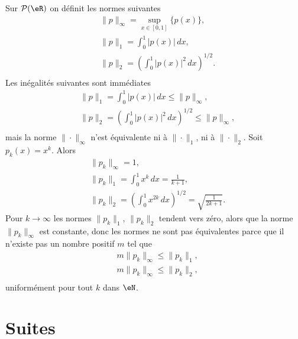 Sur $\mathcal{P}(\eR)$ on définit les normes suivantes 
\begin{equation}
\begin{aligned}
&\|p\|_\infty=\sup_{x\in[0,1]}\{p(x)\},\\
&\|p\|_1 =\int_0^1|p(x)|\, dx,\\
&\|p\|_2 =\left(\int_0^1|p(x)|^2\, dx\right)^{1/2}.\\
\end{aligned}
\end{equation}
Les inégalités suivantes sont  immédiates
\begin{equation}
\begin{aligned}
&\|p\|_1 =\int_0^1|p(x)|\, dx\leq \|p\|_\infty,\\
&\|p\|_2 =\left(\int_0^1|p(x)|^2\, dx\right)^{1/2}\leq \|p\|_\infty,\\
\end{aligned}
\end{equation}
mais la norme $\|\cdot\|_\infty$ n'est  équivalente ni à $\|\cdot\|_1$, ni à $\|\cdot\|_2$. Soit $p_k(x)= x^k$. Alors
\begin{equation}
\begin{aligned}
&\|p_k\|_\infty=1,\\
&\|p_k\|_1 =\int_0^1x^k\, dx=  \frac{1}{k+1},\\
&\|p_k\|_2 =\left(\int_0^1x^{2k}\, dx\right)^{1/2}=\sqrt{\frac{1}{2k+1}}.
\end{aligned}
\end{equation}
Pour $k\to \infty$ les normes $\|p_k\|_1$, $\|p_k\|_2$ tendent vers zéro, alors que la norme $\|p_k\|_\infty$ est constante, donc les normes ne sont pas équivalentes parce que il n'existe pas un nombre positif $m$ tel que 
\begin{equation}
\begin{aligned}
& m \|p_k\|_\infty\leq \|p_k\|_1 ,\\
& m \|p_k\|_\infty\leq \|p_k\|_2 ,\\
\end{aligned}
\end{equation}
uniformément pour tout $k$ dans $\eN$.

\section{Suites}

